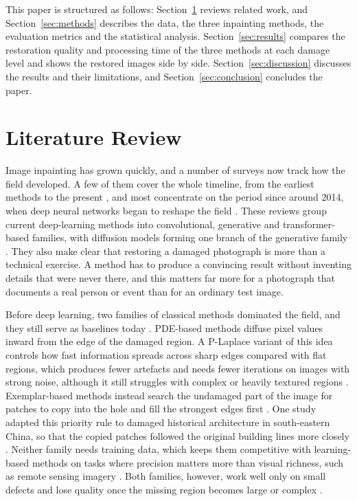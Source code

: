 \documentclass[conference]{IEEEtran}
\begin{document}
This paper is structured as follows: Section~\ref{sec:litreview} reviews related work, and Section~\ref{sec:methods} describes the data, the three inpainting methods, the evaluation metrics and the statistical analysis. Section~\ref{sec:results} compares the restoration quality and processing time of the three methods at each damage level and shows the restored images side by side. Section~\ref{sec:discussion} discusses the results and their limitations, and Section~\ref{sec:conclusion} concludes the paper.

\section{Literature Review}
\label{sec:litreview}

Image inpainting has grown quickly, and a number of surveys now track how the field developed. A few of them cover the whole timeline, from the earliest methods to the present \cite{wang2026,jam2021}, and most concentrate on the period since around 2014, when deep neural networks began to reshape the field \cite{xiang2023,quan2024,zhang2023,xu2023,qin2021,elharrouss2025,su2022,yang2024}. These reviews group current deep-learning methods into convolutional, generative and transformer-based families, with diffusion models forming one branch of the generative family \cite{wang2026}. They also make clear that restoring a damaged photograph is more than a technical exercise. A method has to produce a convincing result without inventing details that were never there, and this matters far more for a photograph that documents a real person or event than for an ordinary test image.

Before deep learning, two families of classical methods dominated the field, and they still serve as baselines today \cite{wang2026}. PDE-based methods diffuse pixel values inward from the edge of the damaged region. A P-Laplace variant of this idea controls how fast information spreads across sharp edges compared with flat regions, which produces fewer artefacts and needs fewer iterations on images with strong noise, although it still struggles with complex or heavily textured regions \cite{xiao2024}. Exemplar-based methods instead search the undamaged part of the image for patches to copy into the hole and fill the strongest edges first \cite{wang2026}. One study adapted this priority rule to damaged historical architecture in south-eastern China, so that the copied patches followed the original building lines more closely \cite{xie2022}. Neither family needs training data, which keeps them competitive with learning-based methods on tasks where precision matters more than visual richness, such as remote sensing imagery \cite{sekrecka2025}. Both families, however, work well only on small defects and lose quality once the missing region becomes large or complex \cite{wang2026}.
\end{document}
